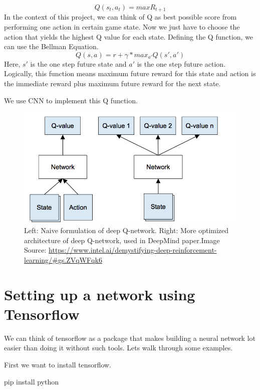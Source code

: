 \documentclass[]{article}
\newenvironment{Shaded}{\begin{snugshade}}{\end{snugshade}}
\newcommand{\ExtensionTok}[1]{#1}
\newcommand{\NormalTok}[1]{#1}
\begin{document}
\[Q(s_t,a_t) = max R_{t+1}\] In the context of this project, we can
think of Q as best possible score from performing one action in certain
game state. Now we just have to choose the action that yields the
highest Q value for each state. Defining the Q function, we can use the
Bellman Equation. \[Q(s,a) = r + \gamma*max_{a'}Q(s',a')\] Here, \(s'\)
is the one step future state and \(a'\) is the one step future action.
Logically, this function means maximum future reward for this state and
action is the immediate reward plus maximum future reward for the next
state.

We use CNN to implement this Q function.

\begin{figure}
\centering
\includegraphics{deep-q-network-example.png}
\caption{Left: Naive formulation of deep Q-network. Right: More
optimized architecture of deep Q-network, used in DeepMind
paper.\n Image Source:
\url{https://www.intel.ai/demystifying-deep-reinforcement-learning/\#gs.ZVqWFqk6}}
\end{figure}

\section{Setting up a network using
Tensorflow}\label{setting-up-a-network-using-tensorflow}

We can think of tensorflow as a package that makes building a neural
network lot easier than doing it without such tools. Lets walk through
some examples.

First we want to install tensorflow.

\begin{Shaded}
\begin{Highlighting}[]
\ExtensionTok{pip}\NormalTok{ install python}
\end{Highlighting}
\end{Shaded}
\end{document}
